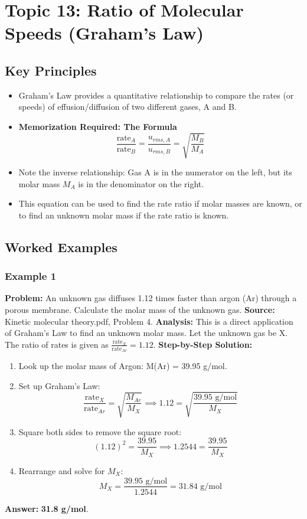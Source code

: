 \documentclass{article}
\begin{document}
\section{Topic 13: Ratio of Molecular Speeds (Graham's Law)}
\subsection{Key Principles}
\begin{itemize}
    \item Graham's Law provides a quantitative relationship to compare the rates (or speeds) of effusion/diffusion of two different gases, A and B.
    \item \textbf{Memorization Required: The Formula}
    \[ \frac{\text{rate}_A}{\text{rate}_B} = \frac{u_{rms, A}}{u_{rms, B}} = \sqrt{\frac{M_B}{M_A}} \]
    \item Note the inverse relationship: Gas A is in the numerator on the left, but its molar mass $M_A$ is in the denominator on the right.
    \item This equation can be used to find the rate ratio if molar masses are known, or to find an unknown molar mass if the rate ratio is known.
\end{itemize}

\subsection{Worked Examples}
\subsubsection{Example 1}
\textbf{Problem:} An unknown gas diffuses 1.12 times faster than argon (Ar) through a porous membrane. Calculate the molar mass of the unknown gas.
\textbf{Source:} Kinetic molecular theory.pdf, Problem 4.
\textbf{Analysis:} This is a direct application of Graham's Law to find an unknown molar mass. Let the unknown gas be X. The ratio of rates is given as $\frac{\text{rate}_X}{\text{rate}_{Ar}} = 1.12$.
\textbf{Step-by-Step Solution:}
\begin{enumerate}
    \item Look up the molar mass of Argon: M(Ar) = 39.95 g/mol.
    \item Set up Graham's Law:
    \[ \frac{\text{rate}_X}{\text{rate}_{Ar}} = \sqrt{\frac{M_{Ar}}{M_X}} \implies 1.12 = \sqrt{\frac{39.95 \text{ g/mol}}{M_X}} \]
    \item Square both sides to remove the square root:
    \[ (1.12)^2 = \frac{39.95}{M_X} \implies 1.2544 = \frac{39.95}{M_X} \]
    \item Rearrange and solve for $M_X$:
    \[ M_X = \frac{39.95 \text{ g/mol}}{1.2544} = 31.84 \text{ g/mol} \]
\end{enumerate}
\textbf{Answer:} \textbf{31.8 g/mol}.
\end{document}
